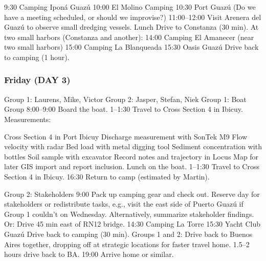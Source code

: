 9:30 Camping Iponá Guazú
10:00 El Molino Camping
10:30 Port Guazú (Do we have a meeting scheduled, or should we improvise?)
11:00–12:00 Visit Arenera del Guazú to observe small dredging vessels.
Lunch
Drive to Constanza (30 min).
At two small harbors (Constanza and another):
14:00 Camping El Amanecer (near two small harbors)
15:00 Camping La Blanqueada
15:30 Oasis Guazú
Drive back to camping (1 hour).


\subsubsection{Friday (DAY 3)}
Group 1: Laurens, Mike, Victor
Group 2: Jasper, Stefan, Niek
Group 1: Boat Group
8:00–9:00 Board the boat.
1–1:30 Travel to Cross Section 4 in Ibicuy.
Measurements:

Cross Section 4 in Port Ibicuy
Discharge measurement with SonTek M9
Flow velocity with radar
Bed load with metal digging tool
Sediment concentration with bottles
Soil sample with excavator
Record notes and trajectory in Locus Map for later GIS import and report inclusion.
Lunch on the boat.
1–1:30 Travel to Cross Section 4 in Ibicuy.
16:30 Return to camp (estimated by Martin).

Group 2: Stakeholders
9:00 Pack up camping gear and check out.
Reserve day for stakeholders or redistribute tasks, e.g., visit the east side of Puerto Guazú if Group 1 couldn’t on Wednesday. Alternatively, summarize stakeholder findings.
Or:
Drive 45 min east of RN12 bridge.
14:30 Camping La Torre
15:30 Yacht Club Guazú
Drive back to camping (30 min).
Groups 1 and 2:
Drive back to Buenos Aires together, dropping off at strategic locations for faster travel home.
1.5–2 hours drive back to BA.
19:00 Arrive home or similar.